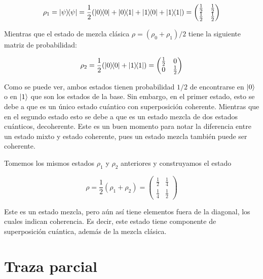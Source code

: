 \begin{equation}
    \rho_1 = \ketbra{\psi}{\psi} = \frac{1}{2} (\ketbra{0}{0} + \ketbra{0}{1} + \ketbra{1}{0} + \ketbra{1}{1}) =
    \begin{pmatrix}
        \frac{1}{2} & \frac{1}{2} \\
        \frac{1}{2} & \frac{1}{2}
    \end{pmatrix}
\end{equation}

Mientras que el estado de mezcla clásica $\rho = (\rho_0 + \rho_1)/2$ tiene la siguiente matriz de probabilidad:

\begin{equation}
    \rho_2 = \frac{1}{2} (\ketbra{0}{0} + \ketbra{1}{1}) =
    \begin{pmatrix}
        \frac{1}{2} & 0 \\
        0 & \frac{1}{2}
    \end{pmatrix}
\end{equation}

Como se puede ver, ambos estados tienen probabilidad $1/2$ de encontrarse en $\ket{0}$ o en $\ket{1}$ que son los estados de la base. Sin embargo, en el primer estado, esto se debe a que es un único estado cuántico con superposición coherente. Mientras que en el segundo estado esto se debe a que es un estado mezcla de dos estados cuánticos, decoherente. Este es un buen momento para notar la diferencia entre un estado mixto y estado coherente, pues un estado mezcla también puede ser coherente.

Tomemos los mismos estados $\rho_1$ y $\rho_2$ anteriores y construyamos el estado

\begin{equation}
    \rho = \frac{1}{2} (\rho_1 + \rho_2) =
    \begin{pmatrix}
        \frac{1}{2} & \frac{1}{4} \\
        \frac{1}{4} & \frac{1}{2}
    \end{pmatrix}
\end{equation}

Este es un estado mezcla, pero aún así tiene elementos fuera de la diagonal, los cuales indican coherencia. Es decir, este estado tiene componente de superposición cuántica, además de la mezcla clásica.

\section{Traza parcial}

